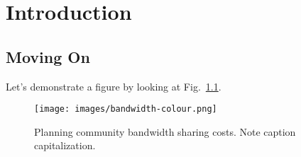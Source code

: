 \chapter{Introduction}

\section{Moving On}
Let's demonstrate a figure by looking at Fig.~\ref{bandwidth}. 

\begin{figure}[!h]
\centering
\texttt{[image: images/bandwidth-colour.png]}
\caption{Planning community bandwidth sharing costs. Note caption capitalization.}
\label{bandwidth}
\end{figure}



